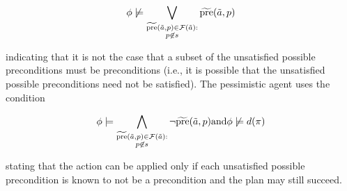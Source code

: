 \documentclass{article}
\begin{document}
\begin{align}
\phi \not\models \bigvee\limits_{\substack{\widetilde{\text{pre}}(\tilde{a},p) \in {\cal F}(\tilde{a}):\\ p \not\in s} } \widetilde{\text{pre}}(\tilde{a},p)
\end{align}

\noindent indicating that it is not the case that a subset of the unsatisfied possible preconditions must be preconditions (i.e., it is possible that the unsatisfied possible preconditions need not be satisfied).  The pessimistic agent uses the condition

\begin{align}
\phi \models \bigwedge\limits_{\substack{\widetilde{\text{pre}}(\tilde{a},p) \in {\cal F}(\tilde{a}):\\ p \not\in s} }\neg \widetilde{\text{pre}}(\tilde{a},p) \text{and} \phi \not\models d(\pi)
\end{align}

\noindent stating that the action can be applied only if each unsatisfied possible precondition is known to not be a precondition and the plan may still succeed.


%
%
\end{document}
